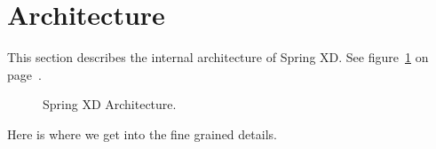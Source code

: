 \section{Architecture}
This section describes the internal architecture of Spring XD. See figure~\ref{fig:architecture} on page~\pageref{fig:architecture}.

\begin{figure}
\centering
{}
\caption{Spring XD Architecture.}
\label{fig:architecture}
\end{figure}

Here is where we get into the fine grained details.